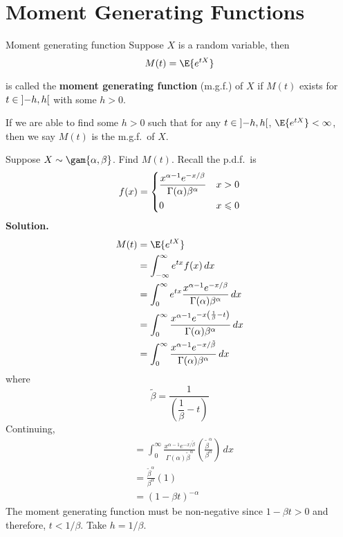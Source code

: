 \section{Moment Generating Functions}
\begin{Definition}{Moment generating function}{}
    Suppose $ X $ is a random variable, then
    \[ M(t)=\E{e^{tX}} \]

    is called the \textbf{moment generating function} (m.g.f.) of $ X $
    if $ M(t) $ exists for $ t\in\interval[open]{-h}{h} $ with some $ h>0 $.
\end{Definition}
\begin{Remark}{}{}
    If we are able to find some $ h>0 $ such that for any
    $ t\in\interval[open]{-h}{h} $,
    $ \E{e^{tX}}<\infty $, then we
    say $ M(t) $ is the m.g.f.\ of $ X $.
\end{Remark}

\begin{Example}{}{}
    Suppose $ X \sim \gam{\alpha,\beta}$.
    Find $ M(t) $.
    Recall the p.d.f.\ is
    \[ f(x)=\begin{dcases}
            \frac{x^{\alpha-1}e^{-x/\beta}}{\Gamma(\alpha)\beta^\alpha} & x>0          \\
            0                                                           & x\leqslant 0
        \end{dcases}
    \]
    \textbf{Solution.}
    \begin{align*}
        M(t)
         & =\E{e^{tX}}                                                                                     \\
         & =\int_{-\infty}^{\infty} e^{tx}f(x)\, d{x}                                                      \\
         & =\int_{0}^{\infty} e^{tx} \frac{x^{\alpha-1}e^{-x/\beta}}{
        \Gamma(\alpha)\beta^\alpha
        } \, d{x}                                                                                          \\
         & =\int_{0}^{\infty} \frac{x^{\alpha-1}e^{-x\left( \frac{1}{\beta} -t \right)}}{
        \Gamma(\alpha)\beta^\alpha
        } \, d{x}                                                                                          \\
         & = \int_{0}^{\infty} \frac{x^{\alpha-1}e^{-x/\tilde{\beta}}}{\Gamma(\alpha)\beta^\alpha} \, d{x}
    \end{align*}
    where
    \[ \tilde{\beta}=\dfrac{1}{\left(\dfrac{1}{\beta}-t\right)}  \]
    Continuing,
    \begin{align*}
         & =\int_{0}^{\infty} \frac{x^{\alpha-1}e^{-x/\tilde{\beta}}}{\Gamma(\alpha)
        \tilde{\beta}^\alpha} \left( \frac{\tilde{\beta}^\alpha}{\beta^\alpha} \right)  \, d{x} \\
         & =\frac{\tilde{\beta}^\alpha}{\beta^\alpha}(1)                                        \\
         & =\left( 1-\beta t \right)^{-\alpha}
    \end{align*}
    The moment generating function must be non-negative since
    $ 1-\beta t>0 $ and therefore, $ t<1/\beta $. Take $ h=1/\beta $.
\end{Example}

